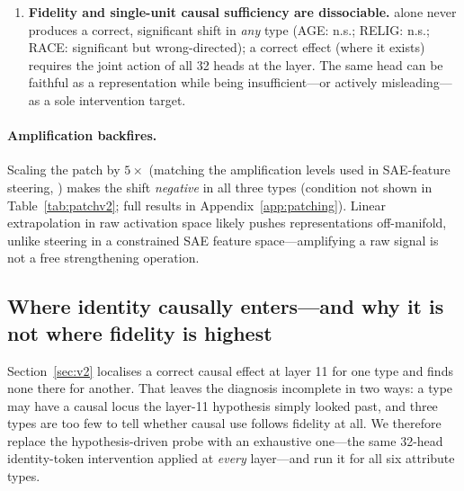 \begin{enumerate}
        $t=-0.1$): if harm merely scaled with disruption, this condition
        would be the most harmful, and it is the least. The consistent
        away-from-truth drift appears only with a \emph{coherent identity
        donor}. Whether it further requires the \emph{paired} group's
        donor is suggestive but unsettled: donors from other same-type
        identities trend the same way weakly (each n.s.), and the direct
        paired contrast against their mean reaches $t=-2.0$, exact
        $p=0.073$. Narrowly, then: single-unit intervention at an
        apparently faithful location remains unreliable in direction.
  \item \textbf{Fidelity and single-unit causal sufficiency are
        dissociable.} \starhead{} alone never produces a correct,
        significant shift in \emph{any} type (AGE: n.s.; RELIG: n.s.;
        RACE: significant but wrong-directed); a correct effect (where it
        exists) requires the joint action of all 32 heads at the layer.
        The same head can be faithful as a representation while being
        insufficient---or actively misleading---as a sole intervention
        target.
\end{enumerate}

\paragraph{Amplification backfires.} Scaling the patch by $5\times$
(matching the amplification levels used in SAE-feature steering,
\citealp{llmopinions2026}) makes the shift \emph{negative} in all three
types (condition not shown in Table~\ref{tab:patchv2}; full results in
Appendix~\ref{app:patching}). Linear extrapolation in raw activation space likely
pushes representations off-manifold, unlike steering in a constrained SAE
feature space---amplifying a raw signal is not a free strengthening
operation.

\subsection{Where identity causally enters---and why it is not where fidelity is highest}
\label{sec:sweep}
Section~\ref{sec:v2} localises a correct causal effect at layer 11 for one
type and finds none there for another. That leaves the diagnosis
incomplete in two ways: a type may have a causal locus the layer-11
hypothesis simply looked past, and three types are too few to tell whether
causal use follows fidelity at all. We therefore replace the
hypothesis-driven probe with an exhaustive one---the same 32-head
identity-token intervention applied at \emph{every} layer---and run it for
all six attribute types.

